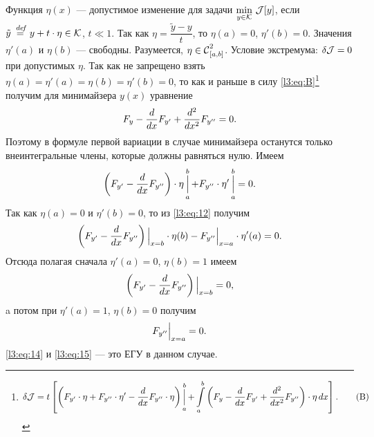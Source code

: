 Функция $\eta(x)$ --- допустимое изменение для задачи $\min\limits_{y\in\K}\,\J[y]$, если $\tilde{y}\eqdef y+t\cdot\eta\in\K$, $t\ll1$. Так как $\eta=\dfrac{\tilde{y}-y}{t}$, то $\eta(a)=0$, $\eta'(b)=0$. Значения $\eta'(a)$ и $\eta(b)$ --- свободны. Разумеется, $\eta\in\Cfn[{[a,b]}]{2}$. Условие экстремума: $\delta\J=0$ при допустимых $\eta$. Так как не запрещено взять $\eta(a)=\eta'(a)=\eta(b)=\eta'(b)=0$, то как и раньше в силу \eqref{l3:eq:B}\footnote{\begin{equation*}
		\hfill\delta\J=t\left[\left(F_{y'}\cdot\eta+F_{y''}\cdot\eta'-\der{}{x}F_{y''}\cdot\eta\right)\mathop{\Big|}\limits_a^b+\int\limits_a^b\left(F_{y}-\der{}{x}F_{y'}+\dder{}{x}F_{y''}\right)\cdot\eta\,dx\right].\hfill\tag{B}
\end{equation*}} получим для минимайзера $y(x)$ уравнение
\begin{equation*}
	\hfill F_y-\der{}{x}F_{y'}+\dder{}{x}F_{y''}=0.\hfill
\end{equation*}
Поэтому в формуле первой вариации в случае минимайзера останутся только внеинтегральные члены, которые должны равняться нулю. Имеем
\begin{equation}
	\label{l3:eq:12}
	\hfill\left(F_{y'}-\der{}{x}F_{y''}\right)\cdot\eta\mathop{\Big|}\limits_a^b+F_{y''}\cdot\eta'\mathop{\Big|}\limits_a^b=0.\hfill
\end{equation}
Так как $\eta(a)=0$ и $\eta'(b)=0$, то из \eqref{l3:eq:12} получим
\begin{equation}
	\label{l3:eq:13}
	\hfill\left(F_{y'}-\der{}{x}F_{y''}\right)\Big|_{x=b}\cdot\eta(b)-F_{y''}\Big|_{x=a}\cdot\eta'(a)=0.\hfill
\end{equation}
Отсюда полагая сначала $\eta'(a)=0$, $\eta(b)=1$ имеем
\begin{equation}
	\label{l3:eq:14}
	\hfill\left(F_{y'}-\der{}{x}F_{y''}\right)\Big|_{x=b}=0,\hfill
\end{equation}
a потом при $\eta'(a)=1$, $\eta(b)=0$ получим 
\begin{equation}
	\label{l3:eq:15}
	\hfill F_{y''}\Big|_{x=a}=0.\hfill
\end{equation}
\eqref{l3:eq:14} и \eqref{l3:eq:15} --- это ЕГУ в данном случае.

